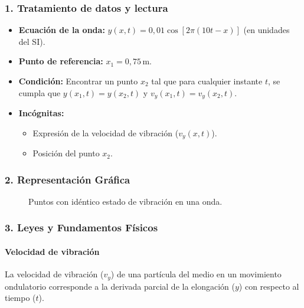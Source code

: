 \subsubsection*{1. Tratamiento de datos y lectura}
\begin{itemize}
    \item \textbf{Ecuación de la onda:} $y(x,t) = 0,01 \cos[2\pi(10t - x)]$ (en unidades del SI).
    \item \textbf{Punto de referencia:} $x_1 = 0,75 \, \text{m}$.
    \item \textbf{Condición:} Encontrar un punto $x_2$ tal que para cualquier instante $t$, se cumpla que $y(x_1, t) = y(x_2, t)$ y $v_y(x_1, t) = v_y(x_2, t)$.
    \item \textbf{Incógnitas:}
    \begin{itemize}
        \item Expresión de la velocidad de vibración ($v_y(x,t)$).
        \item Posición del punto $x_2$.
    \end{itemize}
\end{itemize}

\subsubsection*{2. Representación Gráfica}
\begin{figure}[H]
    \centering
    \caption{Puntos con idéntico estado de vibración en una onda.}
\end{figure}

\subsubsection*{3. Leyes y Fundamentos Físicos}
\paragraph*{Velocidad de vibración} La velocidad de vibración ($v_y$) de una partícula del medio en un movimiento ondulatorio corresponde a la derivada parcial de la elongación ($y$) con respecto al tiempo ($t$).
